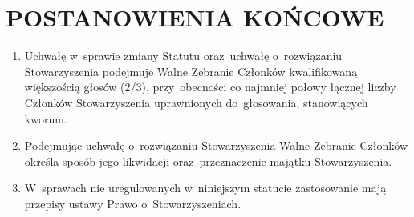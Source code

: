 \documentclass{article}
\begin{document}
\section{POSTANOWIENIA KOŃCOWE}
  \begin{enumerate}
    \item Uchwałę w~sprawie zmiany Statutu oraz~uchwałę o~rozwiązaniu Stowarzyszenia podejmuje Walne Zebranie Członków kwalifikowaną większością głosów (2/3), przy~obecności co najmniej połowy łącznej liczby Członków Stowarzyszenia uprawnionych do~głosowania, stanowiących kworum.
    \item Podejmując uchwałę o~rozwiązaniu Stowarzyszenia Walne Zebranie Członków określa sposób jego likwidacji oraz~przeznaczenie majątku Stowarzyszenia.
    \item W~sprawach nie uregulowanych w~niniejszym statucie zastosowanie mają przepisy ustawy Prawo o~Stowarzyszeniach.
  \end{enumerate}
\end{document}
